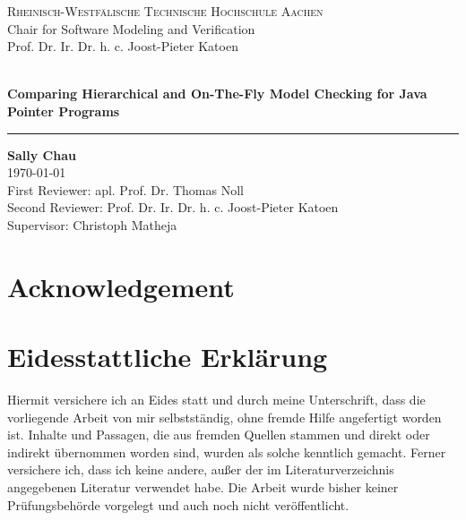 \documentclass[a4paper, 12pt, twoside]{report}
\newcommand*\ruleline[1]{\par\noindent\raisebox{.8ex}{\makebox[\linewidth]{\hrulefill\hspace{1ex}\raisebox{-.8ex}{#1}\hspace{1ex}\hrulefill}}}
\begin{document}
	
	\nocite{heinen2015juggrnaut}
	
	\begin{titlepage}
		\centering
		{\large \scshape Rheinisch-Westfälische Technische Hochschule Aachen}\\
		{\large
			Chair for Software Modeling and Verification\\
			Prof. Dr. Ir. Dr. h. c. Joost-Pieter Katoen\\}
		\vspace*{\fill}
		{\large \ruleline{Master Thesis}}\\
		\vspace{1cm}
		\textbf{\Huge Comparing Hierarchical and On-The-Fly Model Checking for Java Pointer Programs}\\
		\vspace{1cm}
		\hrule
		\vspace{1cm}
		{\Large \textbf{Sally Chau} \\}
		\vspace{0.25cm}
		{\large \today}\\
		\vspace{3cm}
		{\large First Reviewer: apl. Prof. Dr. Thomas Noll \\ Second Reviewer: Prof. Dr. Ir. Dr. h. c. Joost-Pieter Katoen \\ Supervisor: Christoph Matheja} \\ 
		\vspace{1cm}
		\vspace*{\fill}
	\end{titlepage}
	
	\pagestyle{empty}
	
	\clearpage\mbox{}\clearpage
	
	\chapter*{Acknowledgement} 
	
	
	\clearpage\mbox{}\clearpage
	
	\chapter*{Eidesstattliche Erklärung}
	
	Hiermit versichere ich an Eides statt und durch meine Unterschrift, dass die vorliegende Arbeit von mir selbstständig, ohne fremde Hilfe angefertigt worden ist. Inhalte und Passagen, die aus fremden Quellen stammen und direkt oder indirekt übernommen worden sind, wurden als solche kenntlich gemacht. Ferner versichere ich, dass ich keine andere, außer der im Literaturverzeichnis angegebenen Literatur verwendet habe. Die Arbeit wurde bisher keiner Prüfungsbehörde vorgelegt und auch noch nicht veröffentlicht.
	\vspace{20 mm}
	
\end{document}
